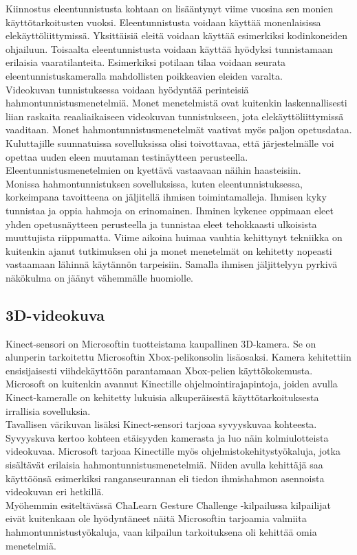 Kiinnostus eleentunnistusta kohtaan on lisääntynyt viime vuosina sen monien käyttötarkoitusten vuoksi.
Eleentunnistusta voidaan käyttää monenlaisissa elekäyttöliittymissä. Yksittäisiä eleitä voidaan 
käyttää esimerkiksi kodinkoneiden ohjailuun. Toisaalta eleentunnistusta voidaan käyttää hyödyksi tunnistamaan
erilaisia vaaratilanteita. Esimerkiksi potilaan tilaa voidaan seurata eleentunnistuskameralla 
mahdollisten poikkeavien eleiden varalta. \citep{chalearn2}\\

Videokuvan tunnistuksessa voidaan hyödyntää perinteisiä hahmontunnistusmenetelmiä. Monet menetelmistä ovat kuitenkin laskennallisesti liian raskaita 
reaaliaikaiseen videokuvan tunnistukseen, jota elekäyttöliittymissä vaaditaan.
Monet hahmontunnistusmenetelmät vaativat myös paljon opetusdataa. Kuluttajille suunnatuissa
sovelluksissa olisi toivottavaa, että järjestelmälle voi opettaa uuden eleen muutaman testinäytteen perusteella.
Eleentunnistusmenetelmien on kyettävä vastaavaan näihin haasteisiin. \citep {Wu:2012:OSL:2393347.2396454}\\

Monissa hahmontunnistuksen sovelluksissa, kuten eleentunnistuksessa, korkeimpana tavoitteena on jäljitellä ihmisen toimintamalleja.
Ihmisen kyky tunnistaa ja oppia hahmoja on erinomainen. Ihminen kykenee oppimaan eleet yhden opetusnäytteen perusteella 
ja tunnistaa eleet tehokkaasti ulkoisista muuttujista riippumatta. Viime aikoina huimaa vauhtia kehittynyt tekniikka on kuitenkin
ajanut tutkimuksen ohi ja monet menetelmät on kehitetty nopeasti vastaamaan lähinnä käytännön tarpeisiin. Samalla 
ihmisen jäljittelyyn pyrkivä näkökulma on jäänyt vähemmälle huomiolle. \citep{chalearn2}

\subsection{3D-videokuva}
Kinect-sensori on Microsoftin tuotteistama kaupallinen 3D-kamera. Se on alunperin tarkoitettu Microsoftin Xbox-pelikonsolin lisäosaksi.
Kamera kehitettiin ensisijaisesti viihdekäyttöön parantamaan Xbox-pelien käyttökokemusta. Microsoft on kuitenkin avannut
Kinectille ohjelmointirajapintoja, joiden avulla Kinect-kameralle on kehitetty lukuisia alkuperäisestä käyttötarkoituksesta 
irrallisia sovelluksia. \citep{kinect}\\

Tavallisen värikuvan lisäksi Kinect-sensori tarjoaa syvyyskuvaa kohteesta. Syvyyskuva kertoo kohteen etäisyyden kamerasta ja luo näin kolmiulotteista videokuvaa. 
Microsoft tarjoaa Kinectille myös ohjelmistokehitystyökaluja, jotka sisältävät erilaisia hahmontunnistusmenetelmiä.
Niiden avulla kehittäjä saa käyttöönsä esimerkiksi ranganseurannan eli tiedon ihmishahmon asennoista videokuvan eri hetkillä. \citep{kinect}\\
Myöhemmin esiteltävässä ChaLearn Gesture Challenge -kilpailussa kilpailijat eivät kuitenkaan ole hyödyntäneet näitä Microsoftin tarjoamia 
valmiita hahmontunnistustyökaluja, vaan kilpailun tarkoituksena oli kehittää omia menetelmiä. \\

